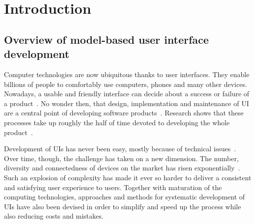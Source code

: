 \section{Introduction}\label{sec:introduction}

\subsection{Overview of model-based user interface development}\label{subsec:user-interfaces-are-important}
Computer technologies are now ubiquitous thanks to user interfaces.
They enable billions of people to comfortably use computers, phones and many other devices.
Nowadays, a usable and friendly interface can decide about a success or failure of a product~\cite{Offutt2002}.
No wonder then, that design, implementation and maintenance of UI are a central point of developing software products~\cite{Anderson2010}.
Research shows that these processes take up roughly the half of time devoted to developing the whole product~\cite{Myers1992}.

Development of UIs has never been easy, mostly because of technical issues~\cite{Six1991}.
Over time, though, the challenge has taken on a new dimension.
The number, diversity and connectedness of devices on the market has risen exponentially~\cite{Cisco2020}.
Such an explosion of complexity has made it ever so harder to deliver a consistent and satisfying user experience to users.
Together with maturation of the computing technologies, approaches and methods for systematic development of UIs have also been devised in order to simplify and speed up the process while also reducing costs and mistakes.


